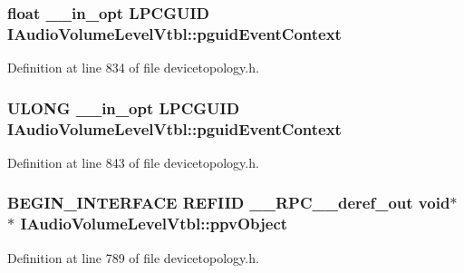 \subsubsection[{\texorpdfstring{pguid\+Event\+Context}{pguidEventContext}}]{ float {\bf \+\_\+\+\_\+in\+\_\+opt} {\bf L\+P\+C\+G\+U\+ID} I\+Audio\+Volume\+Level\+Vtbl\+::pguid\+Event\+Context}\hypertarget{struct_i_audio_volume_level_vtbl_a56276e2c08bb03802c5f2ea4c528c032}{}\label{struct_i_audio_volume_level_vtbl_a56276e2c08bb03802c5f2ea4c528c032}


Definition at line 834 of file devicetopology.\+h.

\subsubsection[{\texorpdfstring{pguid\+Event\+Context}{pguidEventContext}}]{ {\bf U\+L\+O\+NG} {\bf \+\_\+\+\_\+in\+\_\+opt} {\bf L\+P\+C\+G\+U\+ID} I\+Audio\+Volume\+Level\+Vtbl\+::pguid\+Event\+Context}\hypertarget{struct_i_audio_volume_level_vtbl_aa32ad71ca190b421bfba80dd3fd470e4}{}\label{struct_i_audio_volume_level_vtbl_aa32ad71ca190b421bfba80dd3fd470e4}


Definition at line 843 of file devicetopology.\+h.

\subsubsection[{\texorpdfstring{ppv\+Object}{ppvObject}}]{\setlength{\rightskip}{0pt plus 5cm}B\+E\+G\+I\+N\+\_\+\+I\+N\+T\+E\+R\+F\+A\+CE {\bf R\+E\+F\+I\+ID} {\bf \+\_\+\+\_\+\+R\+P\+C\+\_\+\+\_\+deref\+\_\+out} {\bf void}$\ast$$\ast$ I\+Audio\+Volume\+Level\+Vtbl\+::ppv\+Object}\hypertarget{struct_i_audio_volume_level_vtbl_ac6bb08ec0b59d9821cc8f531b07567c2}{}\label{struct_i_audio_volume_level_vtbl_ac6bb08ec0b59d9821cc8f531b07567c2}


Definition at line 789 of file devicetopology.\+h.

